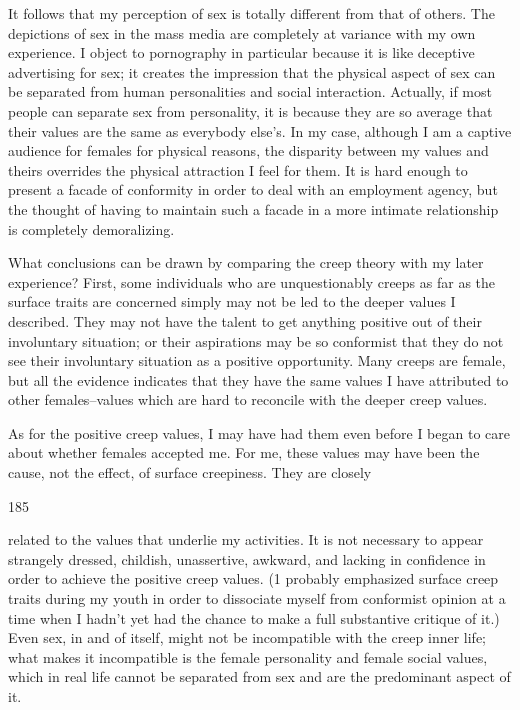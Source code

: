 \documentclass[10pt,twoside]{memoir}
\begin{document}
\begin{enumerate}
{{{It follows that my perception of sex is totally different from that of 
others. The depictions of sex in the mass media are completely at variance 
with my own experience. I object to pornography in particular because it is 
like deceptive advertising for sex; it creates the impression that the physical 
aspect of sex can be separated from human personalities and social 
interaction. Actually, if most people can separate sex from personality, it is 
because they are so average that their values are the same as everybody else's. 
In my case, although I am a captive audience for females for physical 
reasons, the disparity between my values and theirs overrides the physical 
attraction I feel for them. It is hard enough to present a facade of 
conformity in order to deal with an employment agency, but the thought of 
having to maintain such a facade in a more intimate relationship is 
completely demoralizing. 

What conclusions can be drawn by comparing the creep theory with my 
later experience? First, some individuals who are unquestionably creeps as 
far as the surface traits are concerned simply may not be led to the deeper 
values I described. They may not have the talent to get anything positive out 
of their involuntary situation; or their aspirations may be so conformist that 
they do not see their involuntary situation as a positive opportunity. Many 
creeps are female, but all the evidence indicates that they have the same 
values I have attributed to other females--values which are hard to reconcile 
with the deeper creep values. 

As for the positive creep values, I may have had them even before I 
began to care about whether females accepted me. For me, these values may 
have been the cause, not the effect, of surface creepiness. They are closely 


185 


related to the values that underlie my activities. It is not necessary to appear 
strangely dressed, childish, unassertive, awkward, and lacking in confidence 
in order to achieve the positive creep values. (1 probably emphasized surface 
creep traits during my youth in order to dissociate myself from conformist 
opinion at a time when I hadn't yet had the chance to make a full 
substantive critique of it.) Even sex, in and of itself, might not be 
incompatible with the creep inner life; what makes it incompatible is the 
female personality and female social values, which in real life cannot be 
separated from sex and are the predominant aspect of it. 


}}}
\end{enumerate}
\end{document}
